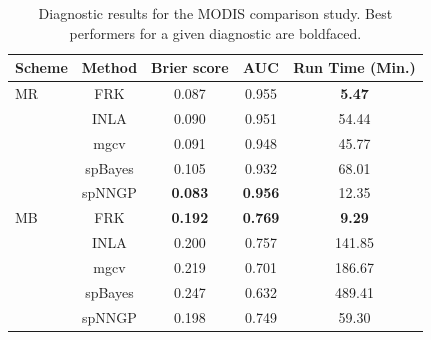 \documentclass[nojss]{jss}
\begin{document}
\begin{table}
    \centering
    \caption{Diagnostic results for the MODIS comparison study. Best performers for a given diagnostic are boldfaced.}
    \label{tab:summary_of_analyses}
    \begin{tabular}{lcccc}
    \hline
   Scheme &  Method  & Brier score & AUC &  Run Time (Min.) \\
   \hline
  MR & FRK & 0.087 & 0.955 & \textbf{5.47} \\ 
   & INLA & 0.090 & 0.951 & 54.44 \\ 
   & mgcv & 0.091 & 0.948 & 45.77 \\ 
   & spBayes & 0.105 & 0.932 & 68.01 \\ 
   & spNNGP & \textbf{0.083} & \textbf{0.956} & 12.35 \\  
   \hline 
MB & FRK & \textbf{0.192} & \textbf{0.769} & \textbf{9.29} \\ 
   & INLA & 0.200 & 0.757 & 141.85 \\ 
   & mgcv & 0.219 & 0.701 & 186.67 \\ 
   & spBayes & 0.247 & 0.632 & 489.41 \\ 
   & spNNGP & 0.198 & 0.749 & 59.30 \\     
   \hline    
  \end{tabular}
\end{table}
 
\end{document}
